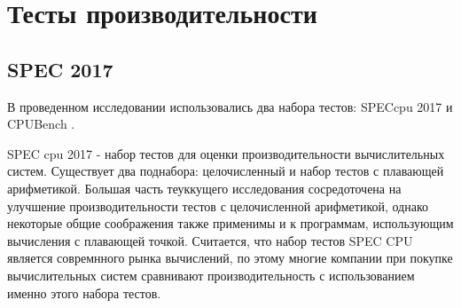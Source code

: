 \section{Тесты производительности}
\subsection{SPEC 2017}
В проведенном исследовании использовались два набора тестов: SPECcpu 2017 \cite{bucek2018spec} и CPUBench \cite{lu2023cpubench}. 

SPEC cpu 2017 - набор тестов для оценки производительности вычислительных систем. Существует два поднабора: целочисленный и набор тестов с плавающей арифметикой. Большая часть теуккущего исследования сосредоточена на улучшение производительности тестов с целочисленной арифметикой, однако некоторые общие соображения также применимы и к программам, использующим вычисления с плавающей точкой. Считается, что набор тестов SPEC CPU является совремнного рынка вычислений, по этому многие компании при покупке вычислительных систем сравнивают производительность с использованием именно этого набора тестов. \cite{bucek2018spec}

